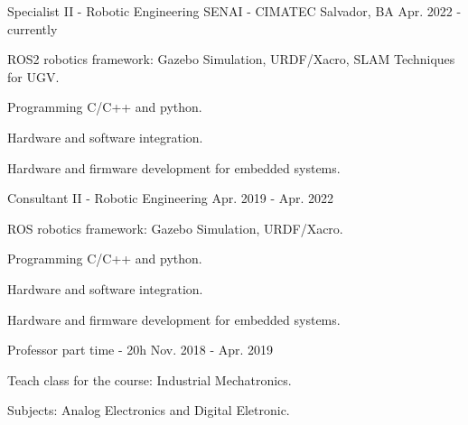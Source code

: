 

\begin{cventries}

\cventry
{Specialist II - Robotic Engineering} %
{SENAI - CIMATEC} %
{Salvador, BA} %
{Apr. 2022 - currently} %
{
  \begin{cvitems} %
    \item {ROS2 robotics framework: Gazebo Simulation, URDF/Xacro, SLAM Techniques for UGV.}
    \item {Programming C/C++ and python.}
    \item {Hardware and software integration.}
    \item {Hardware and firmware development for embedded systems.}
  \end{cvitems}
}

  \cventry
    {Consultant II - Robotic Engineering} %
    {} %
    {} %
    {Apr. 2019 - Apr. 2022} %
    {
      \begin{cvitems} %
        \item {ROS robotics framework: Gazebo Simulation, URDF/Xacro.}
        \item {Programming C/C++ and python.}
        \item {Hardware and software integration.}
        \item {Hardware and firmware development for embedded systems.}
      \end{cvitems}
    }

  \cventry
    {Professor part time - 20h} %
    {} %
    {} %
    {Nov. 2018 - Apr. 2019} %
    {
      \begin{cvitems} %
        \item {Teach class for the course: Industrial Mechatronics.}
        \item {Subjects: Analog Electronics and Digital Eletronic.}
      \end{cvitems}
    }


\end{cventries}
